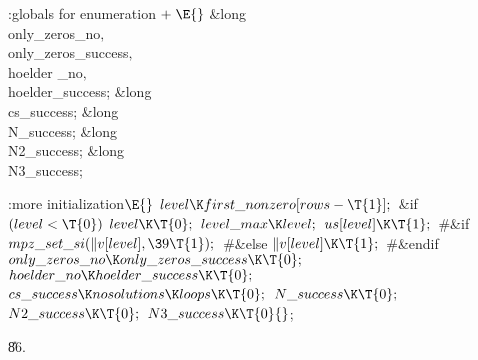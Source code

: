 \B{}:globals for enumeration\X${}\mathrel+\E{}$\6
\&{long} \\{only\_zeros\_no}${},{}$ \\{only\_zeros\_success}${},{}$ \\{hoelder%
\_no}${},{}$ \\{hoelder\_success};\6
\&{long} \\{cs\_success};\6
\&{long} \\{N\_success};\6
\&{long} \\{N2\_success};\6
\&{long} \\{N3\_success};\par
\fi

\B{}:more initialization\X${}\E{}$\6
$\\{level}\K\\{first\_nonzero}[\\{rows}-\T{1}];{}$\6
\&{if} ${}(\\{level}<\T{0}){}$\1\5
${}\\{level}\K\T{0};{}$\2\6
${}\\{level\_max}\K\\{level};{}$\6
${}\\{us}[\\{level}]\K\T{1};{}$\6
\8\#\&{if} \6
${}\\{mpz\_set\_si}(\|v[\\{level}],\39\T{1});{}$\6
\8\#\&{else}\6
${}\|v[\\{level}]\K\T{1};{}$\6
\8\#\&{endif}\6
${}\\{only\_zeros\_no}\K\\{only\_zeros\_success}\K\T{0};{}$\6
${}\\{hoelder\_no}\K\\{hoelder\_success}\K\T{0};{}$\6
${}\\{cs\_success}\K\\{nosolutions}\K\\{loops}\K\T{0};{}$\6
${}\\{N\_success}\K\T{0};{}$\6
${}\\{N2\_success}\K\T{0};{}$\6
${}\\{N3\_success}\K\T{0}{}$;\par
\U86.\fi

